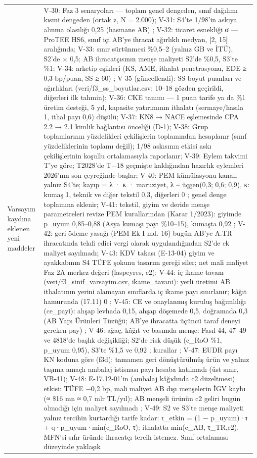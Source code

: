 \begin{longtable}[]{@{}
  >{\raggedright\arraybackslash}p{}
  >{\raggedright\arraybackslash}p{}@{}}
Varsayım kaydına eklenen yeni maddeler & V-30: Faz 3 senaryoları --- toplam genel dengeden, sınıf dağılımı kısmi dengeden (ortak z, N = 2.000); V-31: S4'te 1/98'in askıya alınma olasılığı 0,25 (hasmane AB) \etiketH{}; V-32: ticaret esnekliği σ --- ProTEE HS6, sınıf içi AB'ye ihracat ağırlıklı medyan, {[}2, 15{]} aralığında; V-33: sınır sürtünmesi \%0,5--2 (yalnız GB ve İTÜ), S2'de × 0,5; AB ihracatçısının menşe maliyeti S2'de \%0,5, S3'te \%1; V-34: arketip eşikleri (KS, AME, ithalat penetrasyonu, EDE ≥ 0,3 bp/puan, SS ≥ 60) \etiketH{}; V-35 (güncellendi): SS boyut puanları ve ağırlıkları \etiketH{} (veri/f3\_ss\_boyutlar.csv; 10--18 gözden geçirildi, diğerleri ilk tahmin); V-36: CKE tanımı --- 1 puan tarife ya da \%1 üretim desteği, 5 yıl, kapasite yatırımının ithalatı (sermaye/hasıla 1, ithal payı 0,6) düşülü; V-37: KN8 → NACE eşlemesinde CPA 2.2 → 2.1 kimlik bağlantısı önceliği (D-1); V-38: Grup toplamlarının yüzdelikleri çekilişlerin toplamından hesaplanır (sınıf yüzdeliklerinin toplamı değil); 1/98 askısının etkisi askı çekilişlerinin koşullu ortalamasıyla raporlanır; V-39: Eylem takvimi T'ye göre; T2028'de T−18 geçmişte kaldığından hazırlık eylemleri 2026'nın son çeyreğinde başlar; V-40: PEM kümülasyonu kanalı yalnız S4'te; kayıp = λ · κ · maruziyet, λ \textasciitilde{} üçgen(0,3; 0,6; 0,9), κ: kumaş 1, teknik ve diğer tekstil 0,3, diğerleri 0 \etiketH{}; genel denge toplamına eklenir; V-41: tekstil, giyim ve deride menşe parametreleri revize PEM kurallarından (Karar 1/2023): giyimde p\_uyum 0,85--0,88 (Asya kumaşı payı \%10--15), kumaşta 0,92 \etiketH{}; V-42: geri ödeme yasağı (PEM Ek I md. 16) bugün AB'ye A.TR ihracatında telafi edici vergi olarak uygulandığından S2'de ek maliyet sayılmadı; V-43: KDV takası (E-13-04) giyim ve ayakkabının S4 TÜFE şokunu tasarım gereği siler; net mali maliyet Faz 2A merkez değeri (laspeyres, c2); V-44: iç ikame tavanı (veri/f3\_sinif\_varsayim.csv, ikame\_tavani): yerli üretimi AB ithalatının yerini alamayan sınıflarda iç ikame payı sınırlanır; kâğıt hamurunda (17.11) 0 \etiketH{}; V-45: CE ve onaylanmış kuruluş bağımlılığı (ce\_payi): ahşap levhada 0,15, ahşap döşemede 0,5, doğramada 0,3 (AB Yapı Ürünleri Tüzüğü; AB'ye ihracatta üçüncü taraf deneyi gereken pay) \etiketH{}; V-46: ağaç, kâğıt ve basımda menşe: Fasıl 44, 47--49 ve 4818'de başlık değişikliği; S2'de risk düşük (c\_RoO \%1, p\_uyum 0,95), S3'te \%1,5 ve 0,92 \etiketH{}; kurallar \etiketV{}; V-47: EUDR payı KN koduna göre (f3d); tamamen geri dönüştürülmüş ürün ve yalnız taşıma amaçlı ambalaj istisnası payı hesaba katılmadı (üst sınır, VB-41); V-48: E-17.12-01'in (ambalaj kâğıdında c2 düzeltmesi) etkisi: TÜFE −0,2 bp, mali maliyet AB dışı menşelerin İGV kaybı (≈ \$16 mn ≈ 0,7 mlr TL/yıl); AB menşeli ürünün c2 geliri bugün olmadığı için maliyet sayılmadı \etiketT{}; V-49: S2 ve S3'te menşe maliyeti yalnız tercihin kurtardığı tarife kadar: τ\_etkin = (1 − p\_uyum)·τ + q·p\_uyum·min(c\_RoO, τ); ithalatta min(c\_AB, τ\_TR,c2). MFN'si sıfır üründe ihracatçı tercih istemez. Sınıf ortalaması düzeyinde yaklaşık \etiketT{} \\
\end{longtable}

